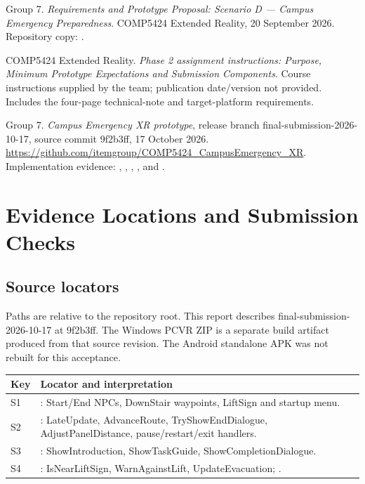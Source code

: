 \documentclass[12pt,a4paper]{article}
\newcommand{\code}[1]{\textnormal{#1}}
\newcommand{\repo}{https://github.com/itemgroup/COMP5424_CampusEmergency_XR}
\begin{document}
\clearpage
\begin{thebibliography}{9}
Group 7. \textit{Requirements and Prototype Proposal: Scenario D --- Campus
Emergency Preparedness}. COMP5424 Extended Reality, 20 September 2026.
Repository copy: .

COMP5424 Extended Reality. \textit{Phase 2 assignment instructions:
Purpose, Minimum Prototype Expectations and Submission Components}.
Course instructions supplied by the team; publication date/version not provided.
Includes the four-page technical-note and target-platform requirements.

Group 7. \textit{Campus Emergency XR prototype}, release branch
\code{final-submission-2026-10-17}, source commit \code{9f2b3ff}, 17 October 2026.
\url{\repo}.
Implementation evidence: ,
,
,
, and
.
\end{thebibliography}

\clearpage
\appendix
{}
\section{Evidence Locations and Submission Checks}
\subsection{Source locators}
Paths are relative to the repository root. This report describes
\code{final-submission-2026-10-17} at \code{9f2b3ff}. The Windows PCVR ZIP is a
separate build artifact produced from that source revision. The Android
standalone APK was not rebuilt for this acceptance.

\begin{tabularx}{\textwidth}{@{}p{0.8cm}Y@{}}
\toprule
\textbf{Key} & \textbf{Locator and interpretation} \\
\midrule
S1 & : Start/End NPCs, DownStair
waypoints, LiftSign and startup menu. \\
S2 & :
\code{LateUpdate}, \code{AdvanceRoute}, \code{TryShowEndDialogue},
\code{AdjustPanelDistance}, pause/restart/exit handlers. \\
S3 & :
\code{ShowIntroduction}, \code{ShowTaskGuide},
\code{ShowCompletionDialogue}. \\
S4 & :
\code{IsNearLiftSign}, \code{WarnAgainstLift}, \code{UpdateEvacuation};
. \\
\bottomrule
\end{tabularx}
\end{document}
